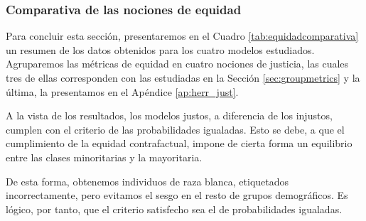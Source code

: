 \documentclass[oneside,openright,titlepage,numbers=noenddot,openany,headinclude,footinclude=true,
cleardoublepage=empty,abstractoff,BCOR=5mm,paper=a4,fontsize=12pt,main=spanish]{scrreprt}
\begin{document}
\subsubsection*{Comparativa de las nociones de equidad}

Para concluir esta sección, presentaremos en el Cuadro \ref{tab:equidadcomparativa} un resumen de los datos obtenidos para los cuatro modelos estudiados. Agruparemos las métricas de equidad en cuatro nociones de justicia, las cuales tres de ellas corresponden con las estudiadas en la Sección \ref{sec:groupmetrics} y la última, la presentamos en el Apéndice \ref{ap:herr_just}.

A la vista de los resultados, los modelos justos, a diferencia de los injustos, cumplen con el criterio de las probabilidades igualadas. Esto se debe, a que el cumplimiento de la equidad contrafactual, impone de cierta forma un equilibrio entre las clases minoritarias y la mayoritaria. 
\clearpage

De esta forma, obtenemos individuos de raza blanca, etiquetados incorrectamente, pero evitamos el sesgo en el resto de grupos demográficos. Es lógico, por tanto, que el criterio satisfecho sea el de probabilidades igualadas.\\
\end{document}

